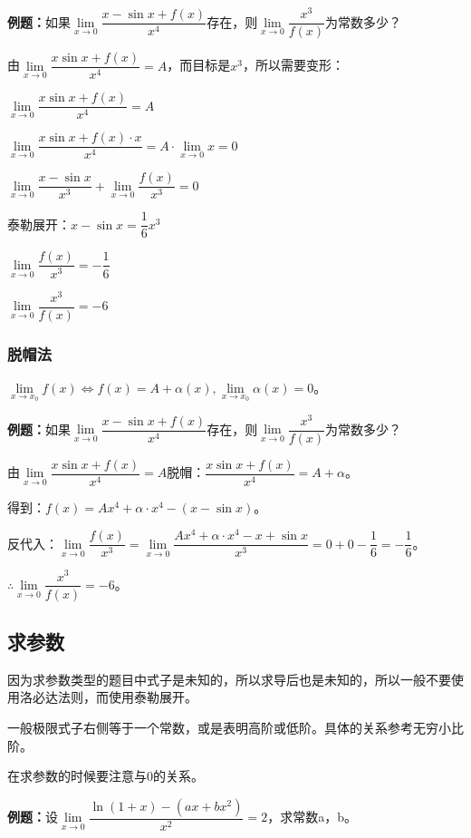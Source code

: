 \documentclass[UTF8, 12pt]{ctexart}
\begin{document}
\textbf{例题：}如果$\lim\limits_{x\to 0}\dfrac{x-\sin x+f(x)}{x^4}$存在，则$\lim\limits_{x\to 0}\dfrac{x^3}{f(x)}$为常数多少？

由$\lim\limits_{x\to 0}\dfrac{x\sin x+f(x)}{x^4}=A$，而目标是$x^3$，所以需要变形：

$\lim\limits_{x\to 0}\dfrac{x\sin x+f(x)}{x^4}=A$

$\lim\limits_{x\to 0}\dfrac{x\sin x+f(x)\cdot x}{x^4}=A\cdot\lim\limits_{x\to 0}x=0$

$\lim\limits_{x\to 0}\dfrac{x-\sin x}{x^3}+\lim\limits_{x\to 0}\dfrac{f(x)}{x^3}=0$

$\text{泰勒展开：}x-\sin x=\dfrac{1}{6}x^3$

$\lim\limits_{x\to 0}\dfrac{f(x)}{x^3}=-\dfrac{1}{6}$

$\lim\limits_{x\to 0}\dfrac{x^3}{f(x)}=-6$

\subsubsection{脱帽法}

$\lim\limits_{x\to x_0}f(x)\Leftrightarrow f(x)=A+\alpha(x),\lim\limits_{x\to x_0}\alpha(x)=0$。

\textbf{例题：}如果$\lim\limits_{x\to 0}\dfrac{x-\sin x+f(x)}{x^4}$存在，则$\lim\limits_{x\to 0}\dfrac{x^3}{f(x)}$为常数多少？

由$\lim\limits_{x\to 0}\dfrac{x\sin x+f(x)}{x^4}=A$脱帽：$\dfrac{x\sin x+f(x)}{x^4}=A+\alpha$。

得到：$f(x)=Ax^4+\alpha\cdot x^4-(x-\sin x)$。

反代入：$\lim\limits_{x\to 0}\dfrac{f(x)}{x^3}=\lim\limits_{x\to 0}\dfrac{Ax^4+\alpha\cdot x^4-x+\sin x}{x^3}=0+0-\dfrac{1}{6}=-\dfrac{1}{6}$。

$\therefore \lim\limits_{x\to 0}\dfrac{x^3}{f(x)}=-6$。

\subsection{求参数}

因为求参数类型的题目中式子是未知的，所以求导后也是未知的，所以一般不要使用洛必达法则，而使用泰勒展开。

一般极限式子右侧等于一个常数，或是表明高阶或低阶。具体的关系参考无穷小比阶。

在求参数的时候要注意与0的关系。\medskip

\textbf{例题：}设$\lim\limits_{x\to 0}\dfrac{\ln(1+x)-(ax+bx^2)}{x^2}=2$，求常数a，b。
\end{document}
